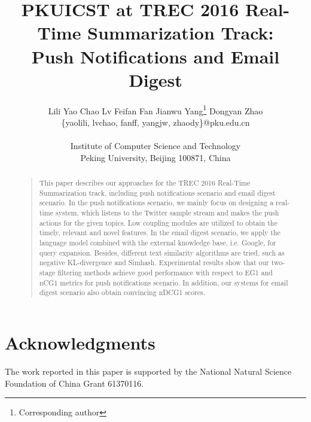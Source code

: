 \documentclass[letterpaper]{article}
\begin{document}
%
\title{PKUICST at TREC 2016 Real-Time Summarization Track:\\
Push Notifications and Email Digest
}
\author{Lili Yao \quad Chao Lv \quad Feifan Fan \quad Jianwu Yang\footnote{Corresponding author} \quad Dongyan Zhao\\
\{yaolili, lvchao, fanff, yangjw, zhaody\}@pku.edu.cn\\
\\
Institute of Computer Science and Technology\\
Peking University, Beijing 100871, China\\
}

\maketitle
\begin{abstract}
\begin{quote}
This paper describes our approaches for the TREC 2016 Real-Time Summarization track,
including push notifications scenario and email digest scenario.
In the push notifications scenario, we mainly focus on designing a real-time system,
which listens to the Twitter sample stream and makes the push actions for the given topics.
Low coupling modules are utilized to obtain the timely, relevant and novel features.
In the email digest scenario, we apply the language model combined
with the external knowledge base, i.e. Google, for query expansion.
Besides, different text similarity algorithms are tried,
such as negative KL-divergence and Simhash.
Experimental results show that our two-stage filtering methods achieve good performance
with respect to EG1 and nCG1 metrics for push notifications scenario.
In addition, our systems for email digest scenario also obtain convincing nDCG1 scores.
\end{quote}
\end{abstract}








\section{Acknowledgments}
The work reported in this paper is supported by the National Natural Science Foundation of China Grant 61370116.



\end{document}
